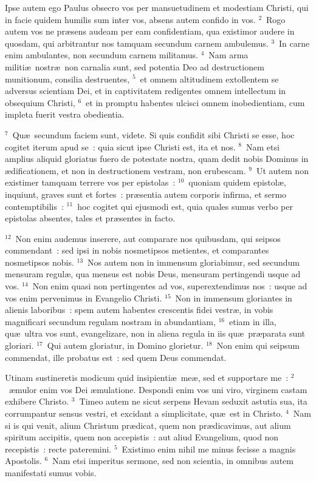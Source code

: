 \lettrine[lines=3,image=true,loversize=0.05,lraise=-0.03]{I}{}pse autem ego Paulus obsecro vos per mansuetudinem et modestiam Christi, qui in facie quidem humilis sum inter vos, absens autem confido in vos.
${}^{2}$~Rogo autem vos ne pr\ae sens audeam per eam confidentiam, qua existimor audere in quosdam, qui arbitrantur nos tamquam secundum carnem ambulemus.
${}^{3}$~In carne enim ambulantes, non secundum carnem militamus.
${}^{4}$~Nam arma militi\ae\ nostr\ae\ non carnalia sunt, sed potentia Deo ad destructionem munitionum, consilia destruentes,
${}^{5}$~et omnem altitudinem extollentem se adversus scientiam Dei, et in captivitatem redigentes omnem intellectum in obsequium Christi,
${}^{6}$~et in promptu habentes ulcisci omnem inobedientiam, cum impleta fuerit vestra obedientia.


${}^{7}$~Qu\ae\ secundum faciem sunt, videte. Si quis confidit sibi Christi se esse, hoc cogitet iterum apud se~: quia sicut ipse Christi est, ita et nos.
${}^{8}$~Nam etsi amplius aliquid gloriatus fuero de potestate nostra, quam dedit nobis Dominus in \ae dificationem, et non in destructionem vestram, non erubescam.
${}^{9}$~Ut autem non existimer tamquam terrere vos per epistolas~:
${}^{10}$~quoniam quidem epistol\ae , inquiunt, graves sunt et fortes~: pr\ae sentia autem corporis infirma, et sermo contemptibilis~:
${}^{11}$~hoc cogitet qui ejusmodi est, quia quales sumus verbo per epistolas absentes, tales et pr\ae sentes in facto.


${}^{12}$~Non enim audemus inserere, aut comparare nos quibusdam, qui seipsos commendant~: sed ipsi in nobis nosmetipsos metientes, et comparantes nosmetipsos nobis.
${}^{13}$~Nos autem non in immensum gloriabimur, sed secundum mensuram regul\ae , qua mensus est nobis Deus, mensuram pertingendi usque ad vos.
${}^{14}$~Non enim quasi non pertingentes ad vos, superextendimus nos~: usque ad vos enim pervenimus in Evangelio Christi.
${}^{15}$~Non in immensum gloriantes in alienis laboribus~: spem autem habentes crescentis fidei vestr\ae , in vobis magnificari secundum regulam nostram in abundantiam,
${}^{16}$~etiam in illa, qu\ae\ ultra vos sunt, evangelizare, non in aliena regula in iis qu\ae\ pr\ae parata sunt gloriari.
${}^{17}$~Qui autem gloriatur, in Domino glorietur.
${}^{18}$~Non enim qui seipsum commendat, ille probatus est~: sed quem Deus commendat.

\lettrine[lines=3,image=true,loversize=0.05,lraise=-0.03]{U}{}tinam sustineretis modicum quid insipienti\ae\ me\ae , sed et supportare me~:
${}^{2}$~\ae mulor enim vos Dei \ae mulatione. Despondi enim vos uni viro, virginem castam exhibere Christo.
${}^{3}$~Timeo autem ne sicut serpens Hevam seduxit astutia sua, ita corrumpantur sensus vestri, et excidant a simplicitate, qu\ae\ est in Christo.
${}^{4}$~Nam si is qui venit, alium Christum pr\ae dicat, quem non pr\ae dicavimus, aut alium spiritum accipitis, quem non accepistis~: aut aliud Evangelium, quod non recepistis~: recte pateremini.
${}^{5}$~Existimo enim nihil me minus fecisse a magnis Apostolis.
${}^{6}$~Nam etsi imperitus sermone, sed non scientia, in omnibus autem manifestati sumus vobis.


